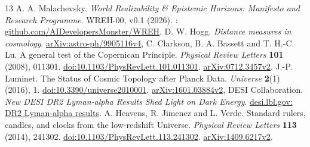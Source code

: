 \begin{thebibliography}{13}
 A. A. Malachevsky. \emph{World Realizability \& Epistemic Horizons: Manifesto and Research Programme}. WREH-00, v0.1 (2026). : \href{https://github.com/AIDevelopersMonster/WREH}{github.com/AIDevelopersMonster/WREH}.
 D. W. Hogg. \emph{Distance measures in cosmology}.  \href{https://arxiv.org/abs/astro-ph/9905116v4}{arXiv:astro-ph/9905116v4}, 
 C. Clarkson, B. A. Bassett and T. H.-C. Lu. A general test of the Copernican Principle. \emph{Physical Review Letters} \textbf{101} (2008), 011301. \href{https://doi.org/10.1103/PhysRevLett.101.011301}{doi:10.1103/PhysRevLett.101.011301}. \href{https://arxiv.org/abs/0712.3457v2}{arXiv:0712.3457v2}.
 J.-P. Luminet. The Status of Cosmic Topology after Planck Data. \emph{Universe} \textbf{2}(1) (2016), 1. \href{https://doi.org/10.3390/universe2010001}{doi:10.3390/universe2010001}. \href{https://arxiv.org/abs/1601.03884v2}{arXiv:1601.03884v2}, 
 DESI Collaboration. \emph{New DESI DR2 Lyman-alpha Results Shed Light on Dark Energy}.  \href{https://www.desi.lbl.gov/2026/07/30/new-desi-dr2-lyman-alpha-results-shed-light-on-dark-energy/}{desi.lbl.gov: DR2 Lyman-alpha results}. 
 A. Heavens, R. Jimenez and L. Verde. Standard rulers, candles, and clocks from the low-redshift Universe. \emph{Physical Review Letters} \textbf{113} (2014), 241302. \href{https://doi.org/10.1103/PhysRevLett.113.241302}{doi:10.1103/PhysRevLett.113.241302}. \href{https://arxiv.org/abs/1409.6217v2}{arXiv:1409.6217v2}.
\end{thebibliography}\endgroup
